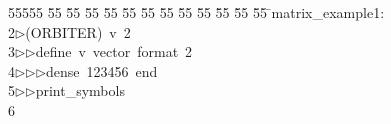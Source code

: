%
%
\begin{tabbing}
55555 \= 55 \= 55 \= 55 \= 55 \= 55 \= 55 \= 55 \= 55 \= 55 \= 55 \= 55 \= 55 \= \>matrix\_example1:\\[0pt]
2\>$\triangleright$\>(ORBITER)\ v\ 2\ \\[0pt]
3\>$\triangleright$\>$\triangleright$\>define\ v\ vector\ format\ 2\ \\[0pt]
4\>$\triangleright$\>$\triangleright$\>$\triangleright$\>dense\ 123456\ end\ \\[0pt]
5\>$\triangleright$\>$\triangleright$\>print\_symbols\\[0pt]
6\>\end{tabbing}
